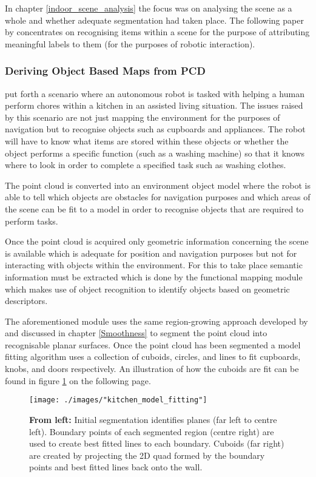 In chapter \ref{indoor_scene_analysis} the focus was on analysing the scene as a whole and whether adequate segmentation had taken place. The following paper by \cite{rabbani_segmentation_2006} concentrates on recognising items within a scene for the purpose of attributing meaningful labels to them (for the purposes of robotic interaction).

\subsubsection*{Deriving Object Based Maps from PCD \label{objectbasedmaps}}
\citet{rusu_towards_2008} put forth a scenario where an autonomous robot is 
tasked with helping a human perform chores within a kitchen in an assisted living situation. The issues raised by this scenario are not just mapping the environment for the purposes of navigation but to recognise objects such as cupboards and appliances. The robot will have to know what items are stored within these objects or whether the object performs a specific function (such as a washing machine) so that it knows where to look in order to complete a specified task such as washing clothes.

The point cloud is converted into an environment object model where the robot is able to tell which objects are obstacles for navigation purposes and which areas of the scene can be fit to a model in order to recognise objects that are required to perform tasks.

Once the point cloud is acquired only geometric information concerning the scene is available which is adequate for position and navigation purposes but not for interacting with objects within the environment. For this to take place semantic information must be extracted which is done by the functional mapping module which makes use of object recognition to identify objects based on geometric descriptors. 

The aforementioned module uses the same region-growing approach developed by \citet{rabbani_segmentation_2006} and discussed in chapter \ref{Smoothness} to segment the point cloud into recognisable planar surfaces. Once the point cloud has been segmented a model fitting algorithm uses a collection of cuboids, circles, and lines to fit cupboards, knobs, and doors respectively. An illustration of how the cuboids are fit can be found in figure \ref{kitchen_model_fitting} on the following page. 
\clearpage
\begin{figure}[ht!]
	\centering
	\texttt{[image: ./images/"kitchen\_model\_fitting"]}
	\caption[Process of segmenting a scene and fitting a model to it]{\textbf{From left:} Initial segmentation identifies planes (far left to centre left). Boundary points of each segmented region (centre right) are used to create best fitted lines to each boundary. Cuboids (far right) are created by projecting the 2D quad formed by the boundary points and best fitted lines back onto the wall. \citep{rusu_towards_2008}
		\label{kitchen_model_fitting}}
\end{figure}

